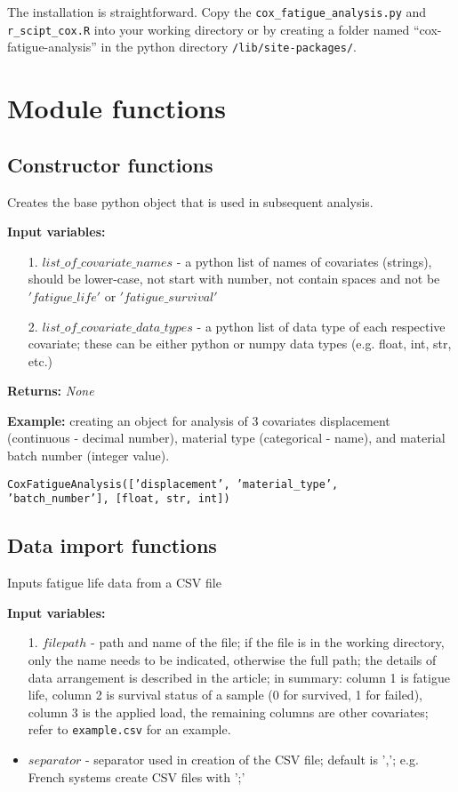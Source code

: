 \documentclass[twoside,a4paper]{refart}
\begin{document}
The installation is straightforward. Copy the \texttt{cox\_fatigue\_analysis.py} and \texttt{r\_scipt\_cox.R} into your working directory or by creating a folder named ``cox-fatigue-analysis'' in the python directory \texttt{/lib/site-packages/}.


\section{Module functions}

\subsection{Constructor functions}

Creates the base python object that is used in subsequent analysis.

\textbf{Input variables:}
\begin{itemize}
    \item[1.] $list\_of\_covariate\_names$ - a python list of names of covariates (strings), should be lower-case, not start with number, not contain spaces and not be $'fatigue\_life'$ or $'fatigue\_survival'$
    \item[2.] $list\_of\_covariate\_data\_types$ - a python list of data type of each respective covariate; these can be either python or numpy data types (e.g. float, int, str, etc.)
\end{itemize}

\textbf{Returns:} \textit{None}

\textbf{Example:} creating an object for analysis of 3 covariates displacement (continuous - decimal number), material type (categorical - name), and material batch number (integer value).

\texttt{CoxFatigueAnalysis(['displacement', 'material\_type',} \\
\texttt{'batch\_number'], [float, str, int]) }



\subsection{Data import functions}

Inputs fatigue life data from a CSV file

\textbf{Input variables:}
\begin{itemize}
    \item[1.] $filepath$ - path and name of the file; if the file is in the working directory, only the name needs to be indicated, otherwise the full path; the details of data arrangement is described in the article; in summary: column 1 is fatigue life, column 2 is survival status of a sample (0 for survived, 1 for failed), column 3 is the applied load, the remaining columns are other covariates; refer to \texttt{example.csv} for an example.
    \item $separator$ - separator used in creation of the CSV file; default is ','; e.g. French systems create CSV files with ';'
\end{itemize}
\end{document}
